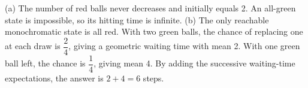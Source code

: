 (a) The number of red balls never decreases and initially equals 2. An all-green state is impossible, so its hitting time is infinite. (b) The only reachable monochromatic state is all red. With two green balls, the chance of replacing one at each draw is $\dfrac{2}{4}$, giving a geometric waiting time with mean 2. With one green ball left, the chance is $\dfrac{1}{4}$, giving mean 4. By adding the successive waiting-time expectations, the answer is $\boxed{2+4=6}$ steps.
